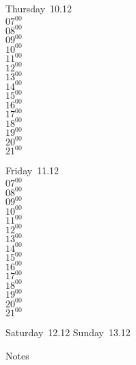 \documentclass[11pt,a4paper]{book}\usepackage[]{graphicx}\usepackage[]{color}
\begin{document}
\clearpage
\begin{headerbox}
\end{headerbox}
\begin{weekdaybox}
  Thursday~10.12\\
  { 
  \vfill
  $07^{00}$\\
$08^{00}$\\
$09^{00}$\\
$10^{00}$\\
$11^{00}$\\
$12^{00}$\\
$13^{00}$\\
$14^{00}$\\
$15^{00}$\\
$16^{00}$\\
$17^{00}$\\
$18^{00}$\\
$19^{00}$\\
$20^{00}$\\
$21^{00}$\\
  }
\end{weekdaybox} 
\begin{weekdaybox}
  Friday~11.12\\
  { 
  \vfill
  $07^{00}$\\
$08^{00}$\\
$09^{00}$\\
$10^{00}$\\
$11^{00}$\\
$12^{00}$\\
$13^{00}$\\
$14^{00}$\\
$15^{00}$\\
$16^{00}$\\
$17^{00}$\\
$18^{00}$\\
$19^{00}$\\
$20^{00}$\\
$21^{00}$\\
  }
\end{weekdaybox}
\begin{weekendbox}
  Saturday~12.12
  \tcblower
  Sunday~13.12
\end{weekendbox} %
\begin{notebox}
  Notes
\end{notebox}
\clearpage
\end{document}
